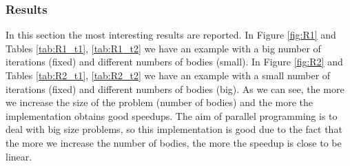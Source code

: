 \documentclass[a4paper]{article}
\begin{document}
\subsubsection{Results}
\label{sec:res}
In this section the most interesting results are reported. In Figure \ref{fig:R1} and Tables \ref{tab:R1_t1}, \ref{tab:R1_t2} we have an example with a big number of iterations (fixed) and different numbers of bodies (small). In Figure \ref{fig:R2} and Tables \ref{tab:R2_t1}, \ref{tab:R2_t2} we have an example with a small number of iterations (fixed) and different numbers of bodies (big). As we can see, the more we increase the size of the problem (number of bodies) and the more the implementation obtains good speedups. The aim of parallel programming is to deal with big size problems, so this implementation is good due to the fact that the more we increase the number of bodies, the more the speedup is close to be linear. \\
\end{document}
